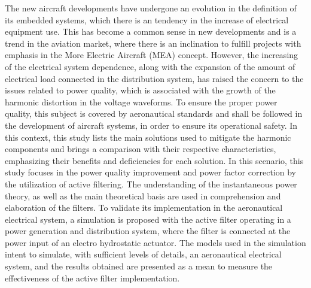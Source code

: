 The new aircraft developments have undergone an evolution in the definition of its embedded systems, which there is an tendency in the increase of electrical equipment use. This has become a common sense in new developments and is a trend in the aviation market, where there is an inclination to fulfill projects with emphasis in the More Electric Aircraft (MEA) concept. However, the increasing of the electrical system dependence, along with the expansion of the amount of electrical load connected in the distribution system, has raised the concern to the issues related to power quality, which is associated with the growth of the harmonic distortion in the voltage waveforms. To ensure the proper power quality, this subject is covered by aeronautical standards and shall be followed in the development of aircraft systems, in order to ensure its operational safety. In this context, this study lists the main solutions used to mitigate the harmonic components and brings a comparison with their respective characteristics, emphasizing their benefits and deficiencies for each solution. In this scenario, this study focuses in the power quality improvement and power factor correction by the utilization of active filtering. The understanding of the instantaneous power theory, as well as the main theoretical basis are used in comprehension and elaboration of the filters. To validate its implementation in the aeronautical electrical system, a simulation is proposed with the active filter operating in a power generation and distribution system, where the filter is connected at the power input of an electro hydrostatic actuator. The models used in the simulation intent to simulate, with sufficient levels of details, an aeronautical electrical system, and the results obtained are presented as a mean to measure the effectiveness of the active filter implementation.